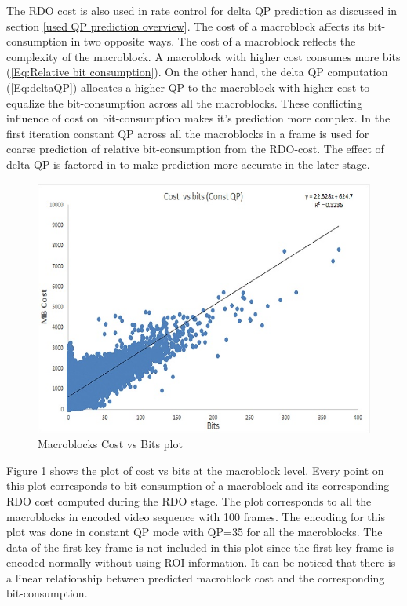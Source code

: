 \documentclass[11pt]{article} %
\begin{document}
The RDO cost is also used in rate control for delta QP prediction as discussed in section \ref{used QP prediction overview}. The cost of a macroblock affects its bit-consumption in two opposite ways. The cost of a macroblock reflects the complexity of the macroblock. A macroblock with higher cost consumes more bits (\ref{Eq:Relative bit consumption}). On the other hand, the delta QP computation (\ref{Eq:deltaQP}) allocates a higher QP to the macroblock with higher cost to equalize the bit-consumption across all the macroblocks. These conflicting influence of cost on bit-consumption makes it's prediction more complex. In the first iteration constant QP across all the macroblocks in a frame is used for coarse prediction of relative bit-consumption from the RDO-cost. The effect of delta QP is factored in to make prediction more accurate in the later stage.

\begin{figure}[!h]
	\centering
	\includegraphics[scale=0.75]{CostVsBits/const_QP/CostvsBits_ConstQP_Full}  
	\caption{Macroblocks Cost vs Bits plot}
	\label{fig:CostvsBits_ConstQP_Full}
\end{figure}

Figure \ref{fig:CostvsBits_ConstQP_Full} shows the plot of cost vs bits at the macroblock level. Every point on this plot corresponds to bit-consumption of a macroblock and its corresponding RDO cost computed during the RDO stage. The plot corresponds to all the macroblocks in encoded video sequence with 100 frames. The encoding for this plot was done in constant QP mode with QP=35 for all the macroblocks. The data of the first key frame is not included in this plot since the first key frame is encoded normally without using ROI information. It can be noticed that there is a linear relationship between predicted macroblock cost and the corresponding bit-consumption. 
\end{document}
